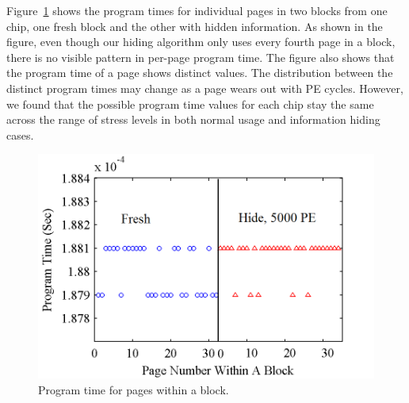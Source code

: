 
Figure~\ref{fig:ptime_block1} shows the program times for individual pages in two 
blocks from one chip, one fresh block and the other with hidden information. 
As shown in the figure, 
even though our hiding algorithm only uses every fourth page in a block,
there is no visible pattern in per-page program time.
The figure also shows that
the program time of a page shows distinct values. The distribution between
the distinct program times may change as a page wears out with PE cycles. However, 
we found that the possible program time values for each chip stay the same across 
the range of stress levels in both normal usage and information hiding cases.

\begin{figure} 
\begin{center} 
\includegraphics[width=\mywidth]{figs/programtime_block.png} 
\caption{Program time for pages within a block.}
\label{fig:ptime_block1} 
\vspace{-0.1in}

\end{center} 
\end{figure}

